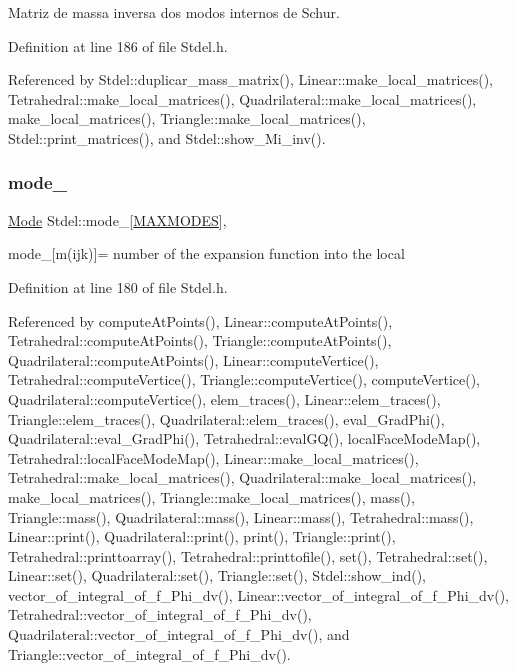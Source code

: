 Matriz de massa inversa dos modos internos de Schur. 



Definition at line 186 of file Stdel.\+h.



Referenced by Stdel\+::duplicar\+\_\+mass\+\_\+matrix(), Linear\+::make\+\_\+local\+\_\+matrices(), Tetrahedral\+::make\+\_\+local\+\_\+matrices(), Quadrilateral\+::make\+\_\+local\+\_\+matrices(), make\+\_\+local\+\_\+matrices(), Triangle\+::make\+\_\+local\+\_\+matrices(), Stdel\+::print\+\_\+matrices(), and Stdel\+::show\+\_\+\+Mi\+\_\+inv().

\mbox{\label{classStdel_a7a09cf048f14496813a914ca6afe7366}} 
\subsubsection{\texorpdfstring{mode\+\_\+}{mode\_}}
{\footnotesize\ttfamily \hyperlink{classMode}{Mode} Stdel\+::mode\+\_\+\mbox{[}\hyperlink{MyOptions_8h_aa75ccd382acf88cec3e9c8025c1f88b7}{M\+A\+X\+M\+O\+D\+ES}\mbox{]}\hspace{0.3cm}{\ttfamily [protected]}, {\ttfamily [inherited]}}



mode\+\_\+\mbox{[}m(ijk)\mbox{]}= number of the expansion function into the local 



Definition at line 180 of file Stdel.\+h.



Referenced by compute\+At\+Points(), Linear\+::compute\+At\+Points(), Tetrahedral\+::compute\+At\+Points(), Triangle\+::compute\+At\+Points(), Quadrilateral\+::compute\+At\+Points(), Linear\+::compute\+Vertice(), Tetrahedral\+::compute\+Vertice(), Triangle\+::compute\+Vertice(), compute\+Vertice(), Quadrilateral\+::compute\+Vertice(), elem\+\_\+traces(), Linear\+::elem\+\_\+traces(), Triangle\+::elem\+\_\+traces(), Quadrilateral\+::elem\+\_\+traces(), eval\+\_\+\+Grad\+Phi(), Quadrilateral\+::eval\+\_\+\+Grad\+Phi(), Tetrahedral\+::eval\+G\+Q(), local\+Face\+Mode\+Map(), Tetrahedral\+::local\+Face\+Mode\+Map(), Linear\+::make\+\_\+local\+\_\+matrices(), Tetrahedral\+::make\+\_\+local\+\_\+matrices(), Quadrilateral\+::make\+\_\+local\+\_\+matrices(), make\+\_\+local\+\_\+matrices(), Triangle\+::make\+\_\+local\+\_\+matrices(), mass(), Triangle\+::mass(), Quadrilateral\+::mass(), Linear\+::mass(), Tetrahedral\+::mass(), Linear\+::print(), Quadrilateral\+::print(), print(), Triangle\+::print(), Tetrahedral\+::printtoarray(), Tetrahedral\+::printtofile(), set(), Tetrahedral\+::set(), Linear\+::set(), Quadrilateral\+::set(), Triangle\+::set(), Stdel\+::show\+\_\+ind(), vector\+\_\+of\+\_\+integral\+\_\+of\+\_\+f\+\_\+\+Phi\+\_\+dv(), Linear\+::vector\+\_\+of\+\_\+integral\+\_\+of\+\_\+f\+\_\+\+Phi\+\_\+dv(), Tetrahedral\+::vector\+\_\+of\+\_\+integral\+\_\+of\+\_\+f\+\_\+\+Phi\+\_\+dv(), Quadrilateral\+::vector\+\_\+of\+\_\+integral\+\_\+of\+\_\+f\+\_\+\+Phi\+\_\+dv(), and Triangle\+::vector\+\_\+of\+\_\+integral\+\_\+of\+\_\+f\+\_\+\+Phi\+\_\+dv().

